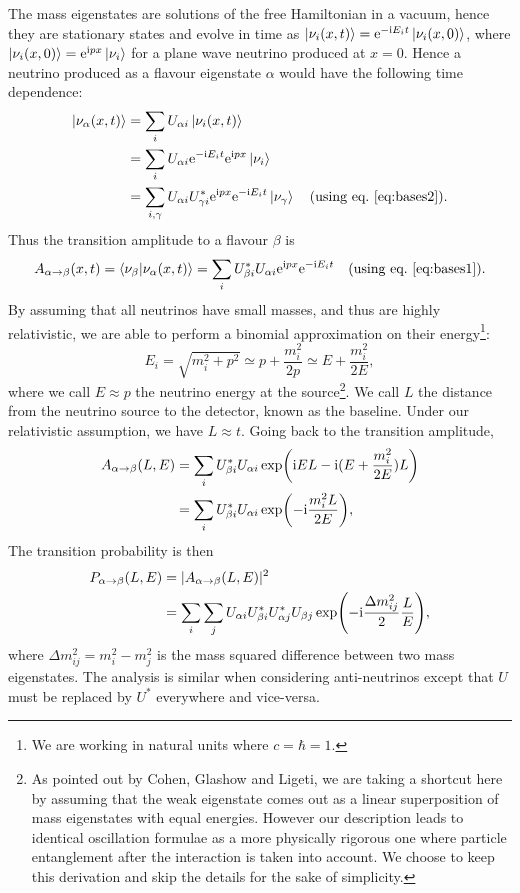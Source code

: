 The mass eigenstates are solutions of the free Hamiltonian in a vacuum, hence
they are stationary states and evolve in time as $\ket{\nu_i(x,
t)} = \mathrm{e}^{-\mathrm{i} E_i t} \ket{\nu_i(x, 0)}$, where $\ket{\nu_i(x, 0)} = \mathrm{e}^{\mathrm{i} p
x} \ket{\nu_i}$ for a plane wave neutrino produced at $x=0$.
Hence a neutrino produced as a flavour eigenstate $\alpha$ would have the
following time dependence:
\begin{align*}
\ket{\nu_\alpha(x, t)} &= \sum_i U_{\alpha i} \ket{\nu_i(x, t)} \\
		&= \sum_i U_{\alpha i} \mathrm{e}^{-\mathrm{i} E_i t} \mathrm{e}^{\mathrm{i} p x} \ket{\nu_i}\\
		&= \sum_{i, \gamma} U_{\alpha i} U^*_{\gamma i} \mathrm{e}^{\mathrm{i} p x}
				\mathrm{e}^{-\mathrm{i} E_i t} \ket{\nu_\gamma}\quad\text{(using eq.~\ref{eq:bases2})}.
\end{align*}
Thus the transition amplitude to a flavour $\beta$ is 
\begin{align}
	A_{\alpha \rightarrow \beta}(x, t) = \bra{\nu_\beta}\ket{\nu_\alpha(x, t)} \nonumber
			= \sum_i U^*_{\beta i} U_{\alpha i} \mathrm{e}^{\mathrm{i} p x}
			\mathrm{e}^{-\mathrm{i} E_i t}\quad\text{(using eq.~\ref{eq:bases1})}.
\end{align}
By assuming that all neutrinos have small masses, and thus are highly
relativistic, we are able to perform a binomial approximation on their
energy\footnote{We are working in natural units where $c=\hbar=1$.}: 
\begin{equation} E_i = \sqrt{m_i^2 + p^2} \simeq p + \frac{m_i^2}{2 p} \simeq E +
\frac{m_i^2}{2E},\label{eq:binomial}\end{equation}
where we call $E \approx p$ the neutrino energy at the source\footnote{As
pointed out by Cohen, Glashow and Ligeti\cite{cohen}, we are taking a shortcut
here by assuming that the weak eigenstate comes out as a linear superposition
of mass eigenstates with equal energies. However our description leads to
identical oscillation formulae as a more physically rigorous one where particle
entanglement after the interaction is taken into account. We choose to keep
this derivation and skip the details for the sake of simplicity.}. We call $L$
the distance from the neutrino source to the detector, known as the baseline.
Under our relativistic assumption, we have $L \approx t$. Going back to the
transition amplitude,
\begin{align*}
	A_{\alpha \rightarrow \beta}(L, E) &= \sum_i U^*_{\beta i} U_{\alpha i}
	\exp(\mathrm{i} E L - \mathrm{i}(E + \frac{m_i^2}{2 E}) L)\\
	&= \sum_i U^*_{\beta i} U_{\alpha i} \exp(-\mathrm{i} \frac{m_i^2 L}{2E}),
\end{align*}
The transition probability is then
\begin{align}
	\label{eq:nuprob}
	P_{\alpha \rightarrow \beta}(L, E) &= |A_{\alpha \rightarrow \beta}(L, E)|^2 \nonumber\\
	&= \sum_i \sum_j U_{\alpha i} U^*_{\beta i} U^*_{\alpha j} U_{\beta j}
	\exp(-\mathrm{i} \frac{\Delta m_{ij}^2}{2} \frac{L}{E}),
\end{align}
where $\Delta m^2_{ij} = m^2_i - m^2_j$ is the mass squared difference between
two mass eigenstates.
The analysis is similar when considering anti-neutrinos except that $U$ must be
replaced by $U^*$ everywhere and vice-versa.

